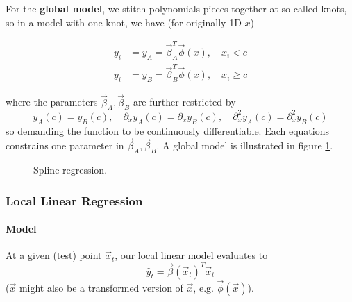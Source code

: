 For the \textbf{global model}, we stitch polynomials pieces together at so called-knots,
so in a model with one knot, we have (for originally 1D $x$)

\begin{equation}
    \begin{aligned}
        y_i &= y_A = \vec{\beta}_A^T \vec{\phi}(x), \quad x_i < c \\
        y_i &= y_B = \vec{\beta}_B^T \vec{\phi}(x), \quad x_i \geq c
    \end{aligned}
\end{equation}

where the parameters $\vec{\beta}_A, \vec{\beta}_B$ are further restricted by
\begin{equation}
    y_A(c) = y_B(c), \quad \partial_x y_A(c) = \partial_x y_B(c), \quad \partial_x^2 y_A(c) = \partial_x^2 y_B(c)
\end{equation}
so demanding the function to be continuously differentiable. Each equations constrains
one parameter in $\vec{\beta}_A, \vec{\beta}_B$. 
A global model is illustrated in figure \ref{fig:spline_regression}.

\begin{figure}[!htb]
 \centering
 \hfill
 \caption{Spline regression.}
 \label{fig:spline_regression}
\end{figure}

\subsubsection{Local Linear Regression}

\paragraph*{Model}
At a given (test) point $\vec{x}_t$, our local linear model evaluates to
\begin{equation}
    \hat{y}_t = \vec{\beta}(\vec{x}_t)^T \vec{x}_t
\end{equation}
($\vec{x}$ might also be a transformed version of $\vec{x}$, e.g. $\vec{\phi}(\vec{x})$).

